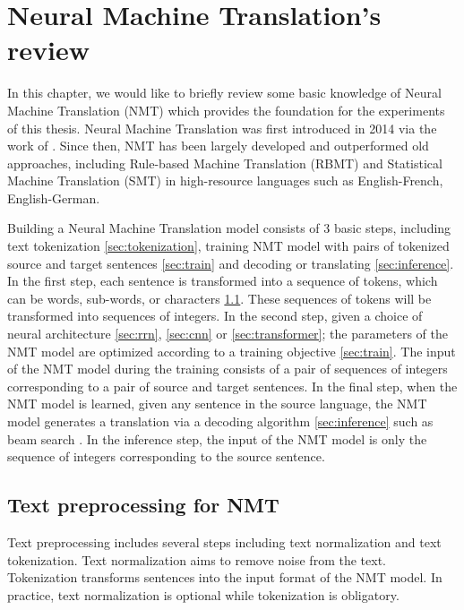 \chapter{Neural Machine Translation’s review}
In this chapter, we would like to briefly review some basic knowledge of Neural Machine Translation (NMT) which provides the foundation for the experiments of this thesis. Neural Machine Translation was first introduced in 2014 via the work of \citet{Bahdanau15learning,Cho14properties}. Since then, NMT has been largely developed and outperformed old approaches, including Rule-based Machine Translation (RBMT) and Statistical Machine Translation (SMT) in high-resource languages such as English-French, English-German.

Building a Neural Machine Translation model consists of 3 basic steps, including text tokenization \ref{sec:tokenization}, training NMT model with pairs of tokenized source and target sentences \ref{sec:train} and decoding or translating \ref{sec:inference}. In the first step, each sentence is transformed into a sequence of tokens, which can be words, sub-words, or characters \ref{sec:preprocessing}. These sequences of tokens will be transformed into sequences of integers. In the second step, given a choice of neural architecture \ref{sec:rrn}, \ref{sec:cnn} or \ref{sec:transformer}; the parameters of the NMT model are optimized according to a training objective \ref{sec:train}. The input of the NMT model during the training consists of a pair of sequences of integers corresponding to a pair of source and target sentences. In the final step, when the NMT model is learned, given any sentence in the source language, the NMT model generates a translation via a decoding algorithm \ref{sec:inference} such as beam search \citep{Koehn04pharaoh}. In the inference step, the input of the NMT model is only the sequence of integers corresponding to the source sentence.

\section{Text preprocessing for NMT \label{sec:tokenization}} \label{sec:preprocessing}
Text preprocessing includes several steps including text normalization and text tokenization. Text normalization aims to remove noise from the text. Tokenization transforms sentences into the input format of the NMT model. In practice, text normalization is optional while tokenization is obligatory.

